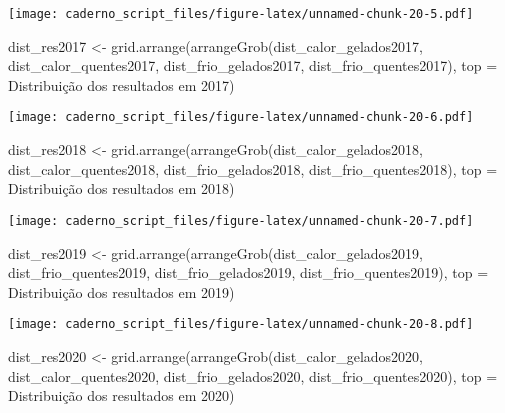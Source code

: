 \documentclass[
]{article}
\newenvironment{Shaded}{\begin{snugshade}}{\end{snugshade}}
\newcommand{\AttributeTok}[1]{\textcolor[rgb]{0.77,0.63,0.00}{#1}}
\newcommand{\FunctionTok}[1]{\textcolor[rgb]{0.00,0.00,0.00}{#1}}
\newcommand{\NormalTok}[1]{#1}
\newcommand{\OtherTok}[1]{\textcolor[rgb]{0.56,0.35,0.01}{#1}}
\newcommand{\StringTok}[1]{\textcolor[rgb]{0.31,0.60,0.02}{#1}}
\begin{document}
\texttt{[image: caderno\_script\_files/figure-latex/unnamed-chunk-20-5.pdf]}

\begin{Shaded}
\begin{Highlighting}[]
\NormalTok{dist\_res2017 }\OtherTok{\textless{}{-}} \FunctionTok{grid.arrange}\NormalTok{(}\FunctionTok{arrangeGrob}\NormalTok{(dist\_calor\_gelados2017, dist\_calor\_quentes2017,}
\NormalTok{                         dist\_frio\_gelados2017, dist\_frio\_quentes2017), }
                         \AttributeTok{top =} \StringTok{\textquotesingle{}Distribuição dos resultados em 2017\textquotesingle{}}\NormalTok{)}
\end{Highlighting}
\end{Shaded}

\texttt{[image: caderno\_script\_files/figure-latex/unnamed-chunk-20-6.pdf]}

\begin{Shaded}
\begin{Highlighting}[]
\NormalTok{dist\_res2018 }\OtherTok{\textless{}{-}} \FunctionTok{grid.arrange}\NormalTok{(}\FunctionTok{arrangeGrob}\NormalTok{(dist\_calor\_gelados2018, dist\_calor\_quentes2018,}
\NormalTok{                         dist\_frio\_gelados2018, dist\_frio\_quentes2018), }
                         \AttributeTok{top =} \StringTok{\textquotesingle{}Distribuição dos resultados em 2018\textquotesingle{}}\NormalTok{)}
\end{Highlighting}
\end{Shaded}

\texttt{[image: caderno\_script\_files/figure-latex/unnamed-chunk-20-7.pdf]}

\begin{Shaded}
\begin{Highlighting}[]
\NormalTok{dist\_res2019 }\OtherTok{\textless{}{-}} \FunctionTok{grid.arrange}\NormalTok{(}\FunctionTok{arrangeGrob}\NormalTok{(dist\_calor\_gelados2019, dist\_frio\_quentes2019,}
\NormalTok{                         dist\_frio\_gelados2019, dist\_frio\_quentes2019), }
                         \AttributeTok{top =} \StringTok{\textquotesingle{}Distribuição dos resultados em 2019\textquotesingle{}}\NormalTok{)}
\end{Highlighting}
\end{Shaded}

\texttt{[image: caderno\_script\_files/figure-latex/unnamed-chunk-20-8.pdf]}

\begin{Shaded}
\begin{Highlighting}[]
\NormalTok{dist\_res2020 }\OtherTok{\textless{}{-}} \FunctionTok{grid.arrange}\NormalTok{(}\FunctionTok{arrangeGrob}\NormalTok{(dist\_calor\_gelados2020, dist\_calor\_quentes2020,}
\NormalTok{                         dist\_frio\_gelados2020, dist\_frio\_quentes2020), }
                         \AttributeTok{top =} \StringTok{\textquotesingle{}Distribuição dos resultados em 2020\textquotesingle{}}\NormalTok{)}
\end{Highlighting}
\end{Shaded}
\end{document}
